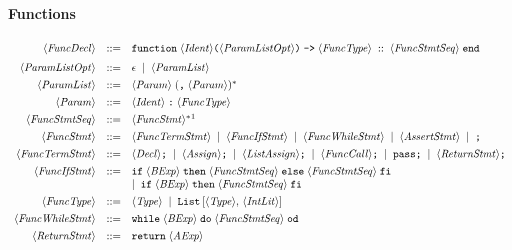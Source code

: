 \documentclass{article}
\begin{document}
\paragraph{Functions}
\[
\begin{array}{rcl}
\langle \mathit{FuncDecl} \rangle
&::=&
\mathtt{function}\;\langle \mathit{Ident} \rangle
\texttt{(}\langle \mathit{ParamListOpt} \rangle\texttt{)}
\;\texttt{->}\;
\langle \mathit{FuncType} \rangle\;
::\;
\langle \mathit{FuncStmtSeq} \rangle\;
\mathtt{end} \\[6pt]

\langle \mathit{ParamListOpt} \rangle
&::=&
\epsilon
\;\mid\;
\langle \mathit{ParamList} \rangle \\[4pt]

\langle \mathit{ParamList} \rangle
&::=&
\langle \mathit{Param} \rangle\;(\texttt{,}\;\langle \mathit{Param} \rangle)^* \\[4pt]

\langle \mathit{Param} \rangle
&::=&
\langle \mathit{Ident} \rangle\;\texttt{:}\;\langle \mathit{FuncType} \rangle 
\\[4pt]

\langle \mathit{FuncStmtSeq} \rangle
&::=&
\langle \mathit{FuncStmt} \rangle^*\footnotemark \\[4pt]

\langle \mathit{FuncStmt} \rangle
&::=&
\langle \mathit{FuncTermStmt} \rangle
\;\mid\;
\langle \mathit{FuncIfStmt} \rangle
\;\mid\;
\langle \mathit{FuncWhileStmt} \rangle
\;\mid\;
\langle \mathit{AssertStmt} \rangle
\;\mid\;
\texttt{;} \\[4pt]

\langle \mathit{FuncTermStmt} \rangle
&::=&
\langle \mathit{Decl} \rangle\texttt{;}
\;\mid\;
\langle \mathit{Assign} \rangle\texttt{;}
\;\mid\;
\langle \mathit{ListAssign} \rangle\texttt{;}
\;\mid\;
\langle \mathit{FuncCall} \rangle\texttt{;}
\;\mid\;
\mathtt{pass}\texttt{;}
\;\mid\;
\langle \mathit{ReturnStmt} \rangle\texttt{;}
\\[4pt]

\langle \mathit{FuncIfStmt} \rangle
&::=&
\mathtt{if}\;\langle \mathit{BExp} \rangle\;\mathtt{then}\;\langle \mathit{FuncStmtSeq} \rangle\;\mathtt{else}\;\langle \mathit{FuncStmtSeq} \rangle\;\mathtt{fi} \\
&& \mid\;
\mathtt{if}\;\langle \mathit{BExp} \rangle\;\mathtt{then}\;\langle \mathit{FuncStmtSeq} \rangle\;\mathtt{fi} \\[4pt]

\langle \mathit{FuncType} \rangle
&::=&
\langle \mathit{Type} \rangle
\;\mid\;
\mathtt{List}\,[\langle \mathit{Type} \rangle,\, \langle \mathit{IntLit} \rangle] \\[4pt]

\langle \mathit{FuncWhileStmt} \rangle
&::=&
\mathtt{while}\;\langle \mathit{BExp} \rangle\;\mathtt{do}\;\langle \mathit{FuncStmtSeq} \rangle\;\mathtt{od} \\[4pt]

\langle \mathit{ReturnStmt} \rangle
&::=&
\mathtt{return}\;\langle \mathit{AExp} \rangle

\end{array}
\]
\end{document}

